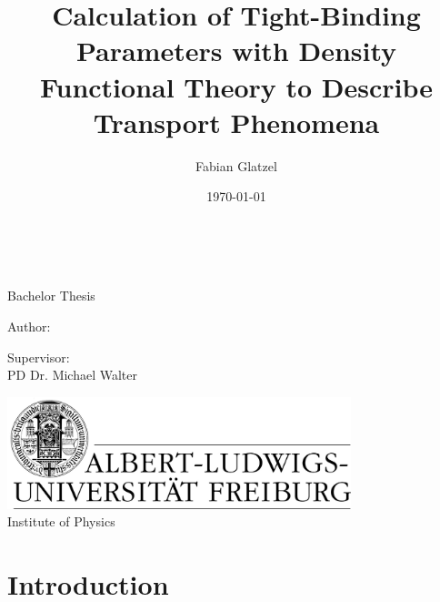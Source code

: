 \documentclass[english,a4paper,10pt,twoside, headsepline, bibliography=totocnumbered, listof=totocnumbered]{scrbook}
\author{Fabian Glatzel}
\title{Calculation of Tight-Binding Parameters with Density Functional Theory to Describe Transport Phenomena}
\date{\today}
\begin{document}
\begin{titlepage}
\centering 
\huge\thetitle\\ 
 
\vspace*{1cm}
 
\Large Bachelor Thesis\\
\vspace*{2cm}
\begin{minipage}{0.49\textwidth}
Author:\\
\theauthor
\end{minipage}
\begin{minipage}{0.49\textwidth}
\begin{flushright}
Supervisor:\\
PD Dr. Michael Walter	
\end{flushright}
\end{minipage}
\vspace*{2cm}
 
\includegraphics[width=10cm]{Images/logo_freiburg}\\
Institute of Physics\\
\vspace*{5cm}
\thedate
\normalsize 
\end{titlepage}

\cleardoublepage







\tableofcontents
{}

\chapter{Introduction}



\listoffigures


\end{document}
